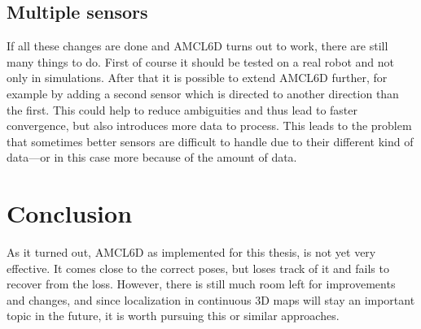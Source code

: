 \documentclass[Thesis.tex]{subfiles}
\begin{document}
\subsection*{Multiple sensors}

If all these changes are done and \gls{AMCL6D} turns out to work, there are still many things to do. First of course it should be tested on a real robot and not only in simulations. After that it is possible to extend \gls{AMCL6D} further, for example by adding a second sensor which is directed to another direction than the first. This could help to reduce ambiguities and thus lead to faster convergence, but also introduces more data to process. This leads to the problem that sometimes better sensors are difficult to handle due to their different kind of data\cite{Smithers:1994}---or in this case more because of the amount of data.

\section*{Conclusion}

As it turned out, \gls{AMCL6D} as implemented for this thesis, is not yet very effective. It comes close to the correct poses, but loses track of it and fails to recover from the loss. However, there is still much room left for improvements and changes, and since localization in continuous 3D maps will stay an important topic in the future, it is worth pursuing this or similar approaches. 
\end{document}
